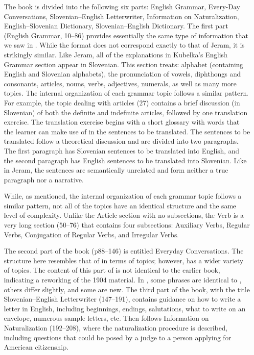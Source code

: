 \documentclass[output=paper,colorlinks,citecolor=brown,arabicfont,chinesefont]{langscibook}
\begin{document}
The book is divided into the following six parts: English Grammar, Every-Day Conversations, Slovenian–English Letterwriter, Information on Naturalization, English–Slovenian Dictionary, Slovenian–English Dictionary. The first part (English Grammar, 10–86) provides essentially the same type of information that we saw in \citet{Jeram1895}. While the format does not correspond exactly to that of Jeram, it is strikingly similar. Like Jeram, all of the explanations in Kubelka’s English Grammar section appear in Slovenian. This section treats: alphabet (containing English and Slovenian alphabets), the pronunciation of vowels, diphthongs and consonants, articles, nouns, verbs, adjectives, numerals, as well as many more topics. The internal organization of each grammar topic follows a similar pattern. For example, the topic dealing with articles (27) contains a brief discussion (in Slovenian) of both the definite and indefinite articles, followed by one translation exercise. The translation exercise begins with a short glossary with words that the learner can make use of in the sentences to be translated. The sentences to be translated follow a theoretical discussion and are divided into two paragraphs. The first paragraph has Slovenian sentences to be translated into English, and the second paragraph has English sentences to be translated into Slovenian. Like in Jeram, the sentences are semantically unrelated and form neither a true paragraph nor a narrative.

While, as mentioned, the internal organization of each grammar topic follows a similar pattern, not all of the topics have an identical structure and the same level of complexity. Unlike the Article section with no subsections, the Verb is a very long section (50–76) that contains four subsections: Auxiliary Verbs, Regular Verbs, Conjugation of Regular Verbs, and Irregular Verbs.

The second part of the book (p88–146) is entitled Everyday Conversations. The structure here resembles that of \citet{Kubelka1904} in terms of topics; however, \citet{Kubelka1912b} has a wider variety of topics. The content of this part of \citet{Kubelka1912b} is not identical to the earlier book, indicating a reworking of the 1904 material. In \citet{Kubelka1912b}, some phrases are identical to \citet{Kubelka1904}, others differ slightly, and some are new. The third part of the book, with the title Slovenian–English Letterwriter (147–191), contains guidance on how to write a letter in English, including beginnings, endings, salutations, what to write on an envelope, numerous sample letters, etc. Then follows Information on Naturalization (192–208), where the naturalization procedure is described, including questions that could be posed by a judge to a person applying for American citizenship.
\end{document}
